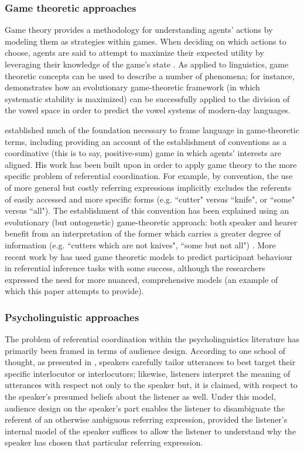 \documentclass[12pt,a4paper]{article}
\begin{document}
\subsubsection{Game theoretic approaches}
Game theory provides a methodology for understanding agents' actions by modeling them as strategies within games. When deciding on which actions to choose, agents are said to attempt to maximize their expected utility by leveraging their knowledge of the game's state \citep{benz2005}. As applied to linguistics, game theoretic concepts can be used to describe a number of phenomena; for instance, \cite{jaeger2008} demonstrates how an evolutionary game-theoretic framework (in which systematic stability is maximized) can be successfully applied to the division of the vowel space in order to predict the vowel systems of modern-day languages.

\cite{lewis1969} established much of the foundation necessary to frame language in game-theoretic terms, including providing an account of the establishment of conventions as a coordinative (this is to say, positive-sum) game in which agents' interests are aligned.
His work has been built upon in order to apply game theory to the more specific problem of referential coordination. For example, by convention, the use of more general but costly referring expressions implicitly excludes the referents of easily accessed and more specific forms (e.g. ``cutter" versus ``knife", or ``some" versus ``all"). The establishment of this convention has been explained using an evolutionary (but ontogenetic) game-theoretic approach: both speaker and hearer benefit from an interpretation of the former which carries a greater degree of information (e.g. ``cutters which are not knives", ``some but not all") \citep{benz2005}. More recent work by \cite{degen2012} has used game theoretic models to predict participant behaviour in referential inference tasks with some success, although the researchers expressed the need for more nuanced, comprehensive models (an example of which this paper attempts to provide). 

\subsubsection{Psycholinguistic approaches}
The problem of referential coordination within the psycholinguistics literature has primarily been framed in terms of audience design. According to one school of thought, as presented in \cite{clark1982}, speakers carefully tailor utterances to best target their specific interlocutor or interlocutors; likewise, listeners interpret the meaning of utterances with respect not only to the speaker but, it is claimed, with respect to the speaker's presumed beliefs about the listener as well. Under this model, audience design on the speaker's part enables the listener to disambiguate the referent of an otherwise ambiguous referring expression, provided the listener's internal model of the speaker suffices to allow the listener to understand why the speaker has chosen that particular referring expression. 
\end{document}

